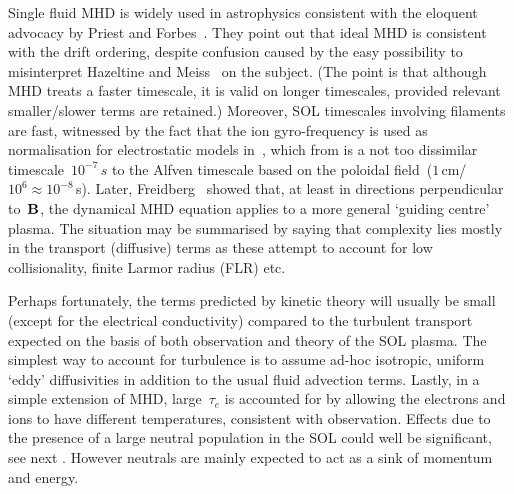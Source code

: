 Single fluid MHD is widely used in astrophysics consistent with the eloquent advocacy
by Priest and Forbes~\cite[\S\,1.7]{priestforbes}. They point out that ideal MHD
is consistent with the drift ordering, despite confusion caused by the easy possibility
to misinterpret
Hazeltine and Meiss~\cite {hazeltinemeiss} on the subject. (The point is that
although MHD treats a faster timescale, it is valid on longer timescales, provided
relevant smaller/slower terms are retained.)
Moreover, SOL timescales involving filaments are fast, witnessed by the fact that
the ion gyro-frequency is used as normalisation for electrostatic models in~\cite{Mi12Simu},
which from  is a not too dissimilar timescale~$10^{-7}\,s$
to the Alfven timescale based on the poloidal field~($1$\,cm/$10^6 \approx 10^{-8}$\,s).
Later, Freidberg~\cite{freidberg}
showed that, at least in directions perpendicular to~${\bf B}$, the dynamical MHD equation
applies to a more general `guiding centre' plasma. The situation may be summarised
by saying that complexity lies mostly in the transport (diffusive) terms
as these attempt to account for low collisionality, finite Larmor radius (FLR) etc.

Perhaps fortunately, the terms predicted by kinetic theory will usually be small
(except for the electrical conductivity) compared to the turbulent transport
expected on the basis of both observation and theory of the SOL plasma. The
simplest way to account for turbulence is to assume ad-hoc isotropic, uniform `eddy'
diffusivities in addition to the usual fluid advection terms.
Lastly, in a simple extension of MHD, large~$\tau_e$  is accounted for by allowing
the electrons and ions to have different temperatures, consistent with observation.
Effects due to the presence of a large neutral population in the SOL
could well be significant, see next .
However neutrals are mainly expected to act as a sink of momentum and energy.

